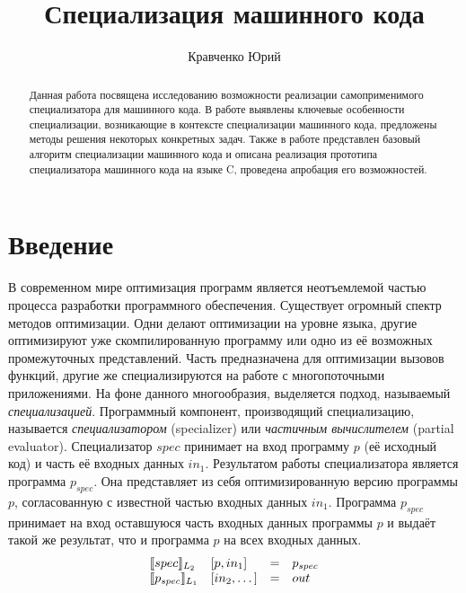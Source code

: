 \lstset{escapechar=@,style=mycode}


\title{Специализация машинного кода}


\author{Кравченко Юрий}



\maketitle

\begin{abstract}
Данная работа посвящена исследованию возможности реализации самоприменимого специализатора для
машинного кода.
В работе выявлены ключевые особенности специализации, возникающие в контексте специализации машинного
кода, предложены методы решения некоторых конкретных задач.
Также в работе представлен базовый алгоритм специализации машинного кода и
описана реализация прототипа специализатора машинного кода на языке \textsf{C},
проведена апробация его возможностей.
\end{abstract}


\section*{Введение}
В современном мире оптимизация программ является неотъемлемой частью процесса разработки программного обеспечения. Существует огромный спектр методов оптимизации.
Одни делают оптимизации на уровне языка, другие оптимизируют уже скомпилированную программу или одно из её возможных промежуточных
представлений.
Часть предназначена для оптимизации вызовов функций, другие же специализируются на работе с многопоточными приложениями.
На фоне данного многообразия, выделяется подход, называемый \emph{специализацией}.
Программный компонент, производящий специализацию, называется \emph{специализатором} (specializer) или
\emph{частичным вычислителем} (partial evaluator).
Специализатор $spec$ принимает на вход программу $p$ (её исходный код) и часть её входных данных $in_1$.
Результатом работы специализатора является программа $p_{spec}$.
Она представляет из себя оптимизированную версию программы $p$, согласованную с известной частью входных данных $in_1$.
Программа $p_{spec}$ принимает на вход оставшуюся часть входных данных программы $p$ и выдаёт такой же результат,
что и программа $p$ на всех входных данных. 
$$\begin{array}{l l c l}
    \llbracket spec \rrbracket_{L_2} & [p, in_1] &= &p_{spec}\\
    \llbracket p_{spec} \rrbracket_{L_1} & [in_2 ,\dots] &= &out
  \end{array}$$
      
